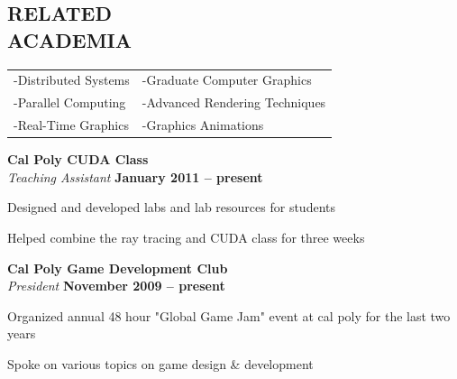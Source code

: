 \documentclass[margin,line]{resume}
\begin{document}
\begin{resume}
\sectionline

    \section{\mysidestyle \textbf{\large{R}\small{ELATED\\ACADEMIA}}} 

	\vspace{1mm} %
	\begin{tabular}{@{}p{6cm}p{6cm}}
	-Distributed Systems     &  -Graduate Computer Graphics   \\
	-Parallel Computing      &  -Advanced Rendering Techniques\\
	-Real-Time Graphics      &  -Graphics Animations          \\
	\end{tabular}

	\textbf{\listing Cal Poly CUDA Class}\\\vspace{1mm}%
	\textsl{Teaching Assistant} \hfill \textbf{ January 2011 -- present}\vspace{-3mm}\\\vspace{-1mm}%
    \begin{list2}
    	\item Designed and developed labs and lab resources for students
        \item Helped combine the ray tracing and CUDA class for three weeks
    \end{list2}\vspace{-1.5mm}

	\textbf{\listing Cal Poly Game Development Club}\\\vspace{1mm}%
	\textsl{President}\hfill \textbf{ November 2009 -- present}\vspace{-3mm}\\\vspace{-1mm}%
    \begin{list2}
    	\item Organized annual 48 hour "Global Game Jam" event at cal poly for the last two years
        \item Spoke on various topics on game design \& development
    \end{list2}\vspace{-1.5mm}


\end{resume}
\end{document}
